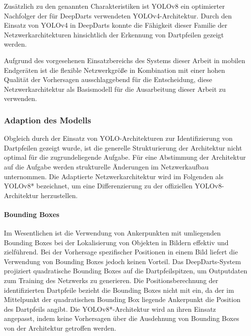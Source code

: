 Zusätzlich zu den genannten Charakteristiken ist YOLOv8 ein optimierter Nachfolger der für DeepDarts verwendeten YOLOv4-Architektur. Durch den Einsatz von YOLOv4 in DeepDarts konnte die Fähigkeit dieser Familie der Netzwerkarchitekturen hinsichtlich der Erkennung von Dartpfeilen gezeigt werden.

Aufgrund des vorgesehenen Einsatzbereichs des Systems dieser Arbeit in mobilen Endgeräten ist die flexible Netzwerkgröße in Kombination mit einer hohen Qualität der Vorhersagen ausschlaggebend für die Entscheidung, diese Netzwerkarchitektur als Basismodell für die Ausarbeitung dieser Arbeit zu verwenden.

\vspace*{-0.12cm}
\subsubsection{Adaption des Modells}
\label{sec:yolo_adaption}

Obgleich durch \citeauthor{deepdarts} der Einsatz von YOLO-Architekturen zur Identifizierung von Dartpfeilen gezeigt wurde, ist die generelle Strukturierung der Architektur nicht optimal für die zugrundeliegende Aufgabe. Für eine Abstimmung der Architektur auf die Aufgabe werden strukturelle Änderungen im Netzwerkaufbau unternommen. Die Adaptierte Netzwerkarchitektur wird im Folgenden als YOLOv8* bezeichnet, um eine Differenzierung zu der offiziellen YOLOv8-Architektur herzustellen.

\vspace*{-0.12cm}
\paragraph{Bounding Boxes}

Im Wesentlichen ist die Verwendung von Ankerpunkten mit umliegenden Bounding Boxes bei der Lokalisierung von Objekten in Bildern effektiv und zielführend. Bei der Vorhersage spezifischer Positionen in einem Bild liefert die Verwendung von Bounding Boxes jedoch keinen Vorteil. Das DeepDarts-System projiziert quadratische Bounding Boxes auf die Dartpfeilspitzen, um Outputdaten zum Training des Netzwerks zu generieren. Die Positionsberechnung der identifizierten Dartpfeile bezieht die Bounding Boxes nicht mit ein, da der im Mittelpunkt der quadratischen Bounding Box liegende Ankerpunkt die Position des Dartpfeils angibt. Die YOLOv8*-Architektur wird an ihren Einsatz angepasst, indem keine Vorhersagen über die Ausdehnung von Bounding Boxes von der Architektur getroffen werden.

